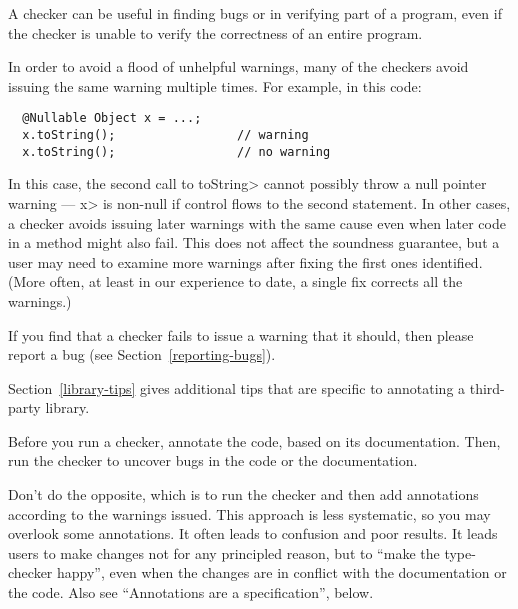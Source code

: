 A checker can be useful in finding bugs or in verifying part of a
program, even if the checker is unable to verify the correctness of an
entire program.

In order to avoid a flood of unhelpful warnings, many of the checkers avoid
issuing the same warning multiple times.  For example, in this code:

\begin{Verbatim}
  @Nullable Object x = ...;
  x.toString();                 // warning
  x.toString();                 // no warning
\end{Verbatim}

\noindent
In this case, the second call to \<toString> cannot possibly throw a null
pointer warning --- \<x> is non-null if control flows to the second
statement.
In other cases, a checker avoids issuing later warnings with the same cause
even when later code in a method might also fail.
This does not
affect the soundness guarantee, but a user may need to examine more
warnings after fixing the first ones identified.  (More often, at least in
our experience to date, a single fix corrects all the warnings.)


If you find that a checker fails to issue a warning that it
should, then please report a bug (see Section~\ref{reporting-bugs}).



Section~\ref{library-tips} gives additional tips that are
specific to annotating a third-party library.



Before you run a checker, annotate the code, based on its documentation.
Then, run the checker to uncover bugs in the code or the documentation.

Don't do the opposite, which is to run the checker and then add annotations
according to the warnings issued.  This approach is less systematic, so you
may overlook some annotations.  It often leads to confusion and poor
results.  It leads users to make changes not for any principled reason, but
to ``make the type-checker happy'', even when the changes are in conflict
with the documentation or the code.  Also see ``Annotations
are a specification'', below.


